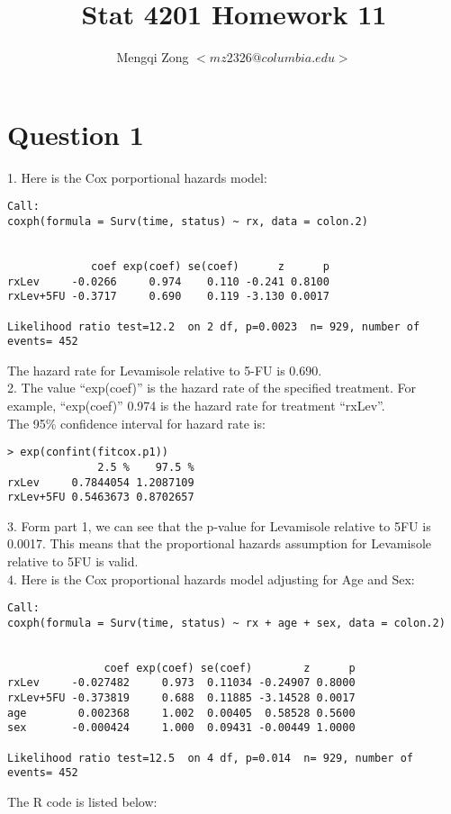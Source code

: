 \documentclass[12pt]{article}
\title{Stat 4201 Homework 11}
\author{Mengqi Zong $<mz2326@columbia.edu>$}
\begin{document}
\maketitle

\setlength{\parindent}{0in}

\section*{Question 1}

1. Here is the Cox porportional hazards model:

\begin{verbatim}
Call:
coxph(formula = Surv(time, status) ~ rx, data = colon.2)


             coef exp(coef) se(coef)      z      p
rxLev     -0.0266     0.974    0.110 -0.241 0.8100
rxLev+5FU -0.3717     0.690    0.119 -3.130 0.0017

Likelihood ratio test=12.2  on 2 df, p=0.0023  n= 929, number of events= 452
\end{verbatim}

The hazard rate for Levamisole relative to 5-FU is 0.690. \\

2. The value ``exp(coef)'' is the hazard rate of the specified
treatment. For example, ``exp(coef)'' 0.974 is the hazard rate for
treatment ``rxLev''. \\

The 95\% confidence interval for hazard rate is:

\begin{verbatim}
> exp(confint(fitcox.p1))
              2.5 %    97.5 %
rxLev     0.7844054 1.2087109
rxLev+5FU 0.5463673 0.8702657
\end{verbatim}

3. Form part 1, we can see that the p-value for Levamisole relative to
5FU is 0.0017. This means that the proportional hazards assumption for
Levamisole relative to 5FU is valid. \\

4. Here is the Cox proportional hazards model adjusting for Age and Sex:

\begin{verbatim}
Call:
coxph(formula = Surv(time, status) ~ rx + age + sex, data = colon.2)


               coef exp(coef) se(coef)        z      p
rxLev     -0.027482     0.973  0.11034 -0.24907 0.8000
rxLev+5FU -0.373819     0.688  0.11885 -3.14528 0.0017
age        0.002368     1.002  0.00405  0.58528 0.5600
sex       -0.000424     1.000  0.09431 -0.00449 1.0000

Likelihood ratio test=12.5  on 4 df, p=0.014  n= 929, number of events= 452
\end{verbatim}

\appendix
\appendixpage
\addappheadtotoc

The R code is listed below:


\end{document}
